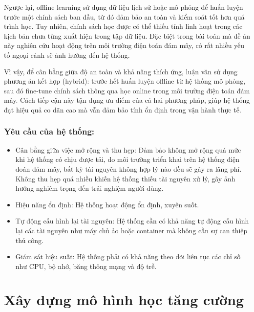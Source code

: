 Ngược lại, offline learning sử dụng dữ liệu lịch sử hoặc mô phỏng để huấn luyện trước một chính sách ban đầu, từ đó đảm bảo an toàn và kiểm soát tốt hơn quá trình học. Tuy nhiên, chính sách học được có thể thiếu tính linh hoạt trong các kịch bản chưa từng xuất hiện trong tập dữ liệu. Đặc biệt trong bài toán mà đề án này nghiên cứu hoạt động trên môi trường điện toán đám mây, có rất nhiều yếu tố ngoại cảnh sẽ ảnh hưởng đến hệ thống.

Vì vậy, để cân bằng giữa độ an toàn và khả năng thích ứng, luận văn sử dụng phương án kết hợp (hybrid): trước hết huấn luyện offline từ hệ thống mô phỏng, sau đó fine-tune chính sách thông qua học online trong môi trường điện toán đám mây. Cách tiếp cận này tận dụng ưu điểm của cả hai phương pháp, giúp hệ thống đạt hiệu quả co dãn cao mà vẫn đảm bảo tính ổn định trong vận hành thực tế.

\subsubsection{Yêu cầu của hệ thống:}

\begin{itemize}
    \item Cân bằng giữa việc mở rộng và thu hẹp: Đảm bảo không mở rộng quá mức khi hệ thống có chịu được tải, do môi trường triển khai trên hệ thống điện đoán đám mây, bất kỳ tài nguyên không hợp lý nào đều sẽ gây ra lãng phí. Không thu hẹp quá nhiều khiến hệ thống thiếu tài nguyên xử lý, gây ảnh hưởng nghiêm trọng đến trải nghiệm người dùng.
    \item Hiệu năng ổn định: Hệ thống hoạt động ổn định, xuyên suốt.
    \item Tự động cấu hình lại tài nguyên: Hệ thống cần có khả năng tự động cấu hình lại các tài nguyên như máy chủ ảo hoặc container mà không cần sự can thiệp thủ công.
    \item Giám sát hiệu suất: Hệ thống phải có khả năng theo dõi liên tục các chỉ số như CPU, bộ nhớ, băng thông mạng và độ trễ.
\end{itemize}

\section{Xây dựng mô hình học tăng cường}


